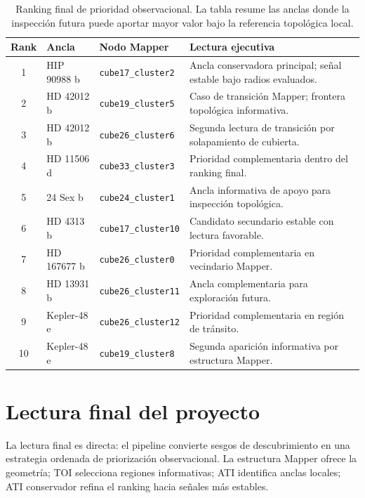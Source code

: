 \documentclass[11pt,letterpaper]{article}
\newcommand{\code}[1]{\texttt{#1}}
\begin{document}
\begin{table}[H]
\centering
\small
\begin{tabularx}{\linewidth}{c l l X}
\toprule
\textbf{Rank} & \textbf{Ancla} & \textbf{Nodo Mapper} & \textbf{Lectura ejecutiva} \\
\midrule
1 & HIP 90988 b & \code{cube17\_cluster2} & Ancla conservadora principal; señal estable bajo radios evaluados. \\
2 & HD 42012 b & \code{cube19\_cluster5} & Caso de transición Mapper; frontera topológica informativa. \\
3 & HD 42012 b & \code{cube26\_cluster6} & Segunda lectura de transición por solapamiento de cubierta. \\
4 & HD 11506 d & \code{cube33\_cluster3} & Prioridad complementaria dentro del ranking final. \\
5 & 24 Sex b & \code{cube24\_cluster1} & Ancla informativa de apoyo para inspección topológica. \\
6 & HD 4313 b & \code{cube17\_cluster10} & Candidato secundario estable con lectura favorable. \\
7 & HD 167677 b & \code{cube26\_cluster0} & Prioridad complementaria en vecindario Mapper. \\
8 & HD 13931 b & \code{cube26\_cluster11} & Ancla complementaria para exploración futura. \\
9 & Kepler-48 e & \code{cube26\_cluster12} & Prioridad complementaria en región de tránsito. \\
10 & Kepler-48 e & \code{cube19\_cluster8} & Segunda aparición informativa por estructura Mapper. \\
\bottomrule
\end{tabularx}
\caption{Ranking final de prioridad observacional. La tabla resume las anclas donde la inspección futura puede aportar mayor valor bajo la referencia topológica local.}
\end{table}

\section{Lectura final del proyecto}

La lectura final es directa: el pipeline convierte sesgos de descubrimiento en una estrategia ordenada de priorización observacional. La estructura Mapper ofrece la geometría; TOI selecciona regiones informativas; ATI identifica anclas locales; ATI conservador refina el ranking hacia señales más estables.
\end{document}

